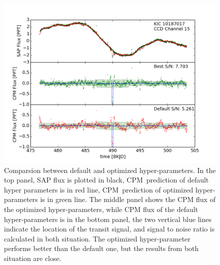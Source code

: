 \documentclass[12pt, preprint]{aastex}
\newcommand{\name}{CPM}
\begin{document}
\begin{figure}[htb]
\centering
\includegraphics[width=\columnwidth]{compare_10187017}
\caption{\label{hyperparameter} Comparsion between default and optimized hyper-parameters. 
In the top panel, SAP flux is plotted in black, \name\ prediction of default hyper parameters is in red line, 
\name\ prediction of optimized hyper-parameters is in green line. 
The middle panel shows the CPM flux of the optimized hyper-parameters, 
while CPM flux of the default hyper-parameters is in the bottom panel, 
the two vertical blue lines indicate the location of the transit signal, and signal to noise ratio is calculated in both situation. 
The optimized hyper-parameter performs better than the default one, but the results from both situation are close. }
\end{figure}

\clearpage
\end{document}

